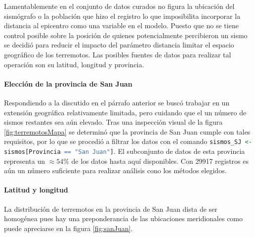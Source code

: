 \documentclass[a4paper]{report}
\begin{document}
Lamentablemente en el conjunto de datos curados no figura la ubicación del sismógrafo o la población que hizo el registro lo que imposibilita incorporar la distancia al epicentro como una variable en el modelo.%
Puesto que no se tiene control posible sobre la posición de quienes potencialmente percibieron un sismo se decidió para reducir el impacto del parámetro distancia limitar el espacio geográfico de los terremotos.
Las posibles fuentes de datos para realizar tal operación son su latitud, longitud y provincia.


\paragraph{Elección de la provincia de San Juan}
Respondiendo a la discutido en el párrafo anterior se buscó trabajar en un extensión geográfica relativamente limitada, pero cuidando que el un número de sismos restantes sea aún elevado.
Tras una inspección visual de la figura \ref{fig:terremotosMapa} se determinó  que la provincia de San Juan cumple con tales requisitos, por lo que se procedió a filtrar los datos con el comando \lstinline[language = R]'sismos_SJ <- sismos[Provincia == "San Juan"]'.
El subconjunto de datos de esta provincia representa un \(\approx 54 \%\) de los datos hasta aquí disponibles.
Con \num{29917} registros es aún un número suficiente para realizar análisis cono los métodos elegidos.



\paragraph{Latitud y longitud}
La distribución de terremotos en la provincia de San Juan dista de ser homogénea pues hay una preponderancia de las ubicaciones meridionales como puede apreciarse en la figura \ref{fig:sanJuan}.
\end{document}
